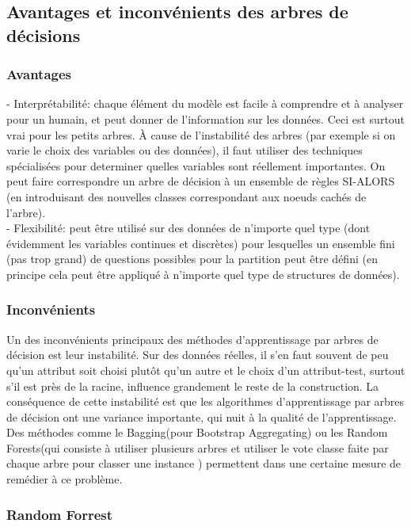 \subsection{Avantages et inconvénients des arbres de décisions}
\subsubsection{Avantages}
- Interprétabilité: chaque élément du modèle est facile à comprendre et à analyser pour un humain, et peut donner de l'information sur les données. Ceci est surtout vrai pour les petits arbres. À cause de l'instabilité des arbres (par exemple si on varie le choix des variables ou des données), il faut utiliser des techniques spécialisées pour determiner quelles variables sont réellement importantes. On peut faire correspondre un arbre de décision à un ensemble de règles SI-ALORS (en introduisant des nouvelles classes correspondant aux noeuds cachés de l'arbre).\\
- Flexibilité: peut être utilisé sur des données de n'importe quel type (dont évidemment les variables continues et discrètes) pour lesquelles un ensemble fini (pas trop grand) de questions possibles pour la partition peut être défini (en principe cela peut être appliqué à n'importe quel type de structures de données). \\
\subsubsection{Inconvénients }

Un des inconvénients principaux des méthodes d'apprentissage par arbres de décision
est leur instabilité. Sur des données réelles, il s’en faut souvent de peu qu'un attribut soit
choisi plutôt qu'un autre et le choix d’un attribut-test, surtout s’il est près de la racine,
influence grandement le reste de la construction. La conséquence de cette instabilité
est que les algorithmes d'apprentissage par arbres de décision ont une variance importante, qui nuit à la qualité de l'apprentissage. Des méthodes comme le Bagging(pour Bootstrap Aggregating) ou les Random Forests(qui consiste à utiliser plusieurs arbres et utiliser le vote classe faite par chaque arbre pour classer une instance ) \cite{RandomForrest1} permettent dans une certaine mesure de remédier à ce problème.

\subsubsection{Random Forrest }

